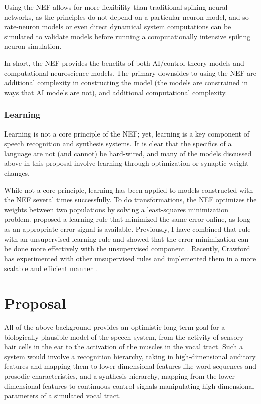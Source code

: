 \documentclass{article}
\begin{document}
Using the NEF allows for more flexibility
than traditional spiking neural networks,
as the principles do not depend
on a particular neuron model,
and so rate-neuron models or even direct
dynamical system computations
can be simulated to validate models
before running a computationally intensive
spiking neuron simulation.

In short, the NEF provides
the benefits of both AI/control theory models
and computational neuroscience models.
The primary downsides to using the NEF
are additional complexity
in constructing the model
(the models are constrained in ways
that AI models are not),
and additional computational complexity.

\subsubsection{Learning}

Learning is not a core principle of the NEF;
yet, learning is a key component
of speech recognition and synthesis systems.
It is clear that the specifics
of a language are not (and cannot)
be hard-wired,
and many of the models
discussed above in this proposal
involve learning through
optimization or synaptic weight changes.

While not a core principle,
learning has been applied to models constructed
with the NEF several times successfully.
To do transformations, the NEF
optimizes the weights between two populations
by solving a least-squares minimization problem.
\citet{macneil2011} proposed
a learning rule that minimized the same
error online, as long as an appropriate
error signal is available.
Previously, I have combined that rule
with an unsupervised learning rule
and showed that the error minimization
can be done more effectively with
the unsupervised component
\citep{bekolay2013}.
Recently, Crawford has experimented
with other unsupervised rules
and implemented them
in a more scalable and efficient manner
\citep{crawford-inpress}.

\section{Proposal}

All of the above background
provides an optimistic long-term
goal for a biologically plausible
model of the speech system,
from the activity of sensory
hair cells in the ear
to the activation of
the muscles in the vocal tract.
Such a system would involve
a recognition hierarchy,
taking in high-dimensional auditory features
and mapping them to lower-dimensional
features like word sequences
and prosodic characteristics,
and a synthesis hierarchy,
mapping from the lower-dimensional features
to continuous control signals
manipulating high-dimensional parameters
of a simulated vocal tract.
\end{document}
